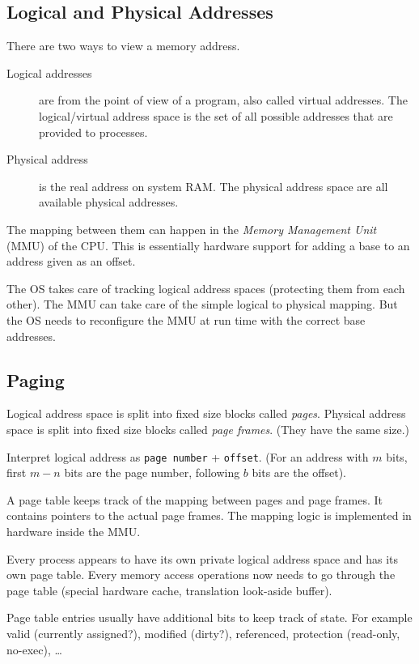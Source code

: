 \documentclass{article}
\newcommand{\code}[1]{\texttt{#1}}
\begin{document}
\begin{multicols}{1}
\subsection*{Logical and Physical Addresses}

There are two ways to view a memory address.

\begin{description}
    \item[Logical addresses] are from the point of view of a program, also called virtual addresses. The logical/virtual address space is the set of all possible addresses that are provided to processes.
    \item[Physical address] is the real address on system RAM. The physical address space are all available physical addresses. 
\end{description}

The mapping between them can happen in the \emph{Memory Management Unit} (MMU) of the CPU. This is essentially hardware support for adding a base to an address given as an offset.

The OS takes care of tracking logical address spaces (protecting them from each other). The MMU can take care of the simple logical to physical mapping. But the OS needs to reconfigure the MMU at run time with the correct base addresses.

\subsection*{Paging}

Logical address space is split into fixed size blocks called \emph{pages}. Physical address space is split into fixed size blocks called \emph{page frames}. (They have the same size.)

Interpret logical address as \code{page number} + \code{offset}. (For an address with $m$ bits, first $m - n$ bits are the page number, following $b$ bits are the offset).

A page table keeps track of the mapping between pages and page frames. It contains pointers to the actual page frames. The mapping logic is implemented in hardware inside the MMU.

Every process appears to have its own private logical address space and has its own page table. Every memory access operations now needs to go through the page table (special hardware cache, translation look-aside buffer).

Page table entries usually have additional bits to keep track of state. For example valid (currently assigned?), modified (dirty?), referenced, protection (read-only, no-exec), \ldots


\end{multicols}
\end{document}
